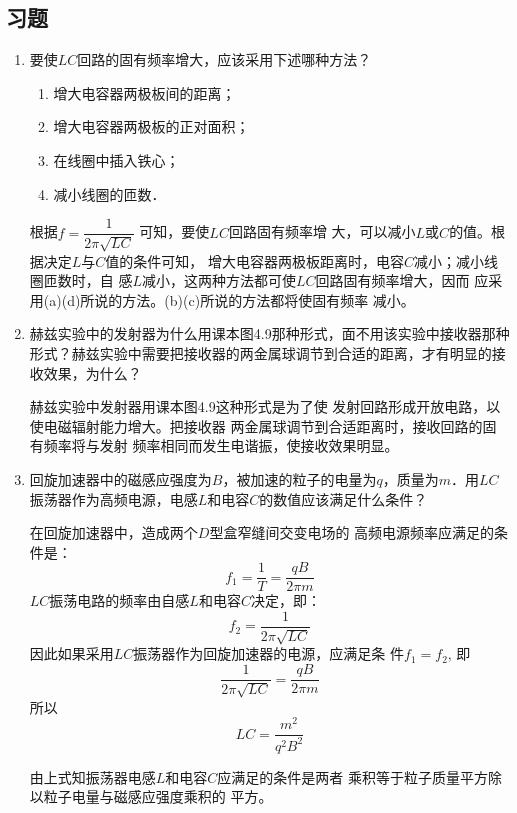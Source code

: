 \subsection{习题}
\begin{enumerate}
	\item 要使$LC$回路的固有频率增大，应该采用下述哪种方法？
	\begin{enumerate}
		\item 增大电容器两极板间的距离；
		\item 增大电容器两极板的正对面积；
		\item 在线圈中插入铁心；
		\item 减小线圈的匝数．
	\end{enumerate}

    \begin{solution}
根据$f=\dfrac{1}{2\pi\sqrt{LC}}$
可知，要使$LC$回路固有频率增
大，可以减小$L$或$C$的值。根据决定$L$与$C$值的条件可知，
增大电容器两极板距离时，电容$C$减小；减小线圈匝数时，自
感$L$减小，这两种方法都可使$LC$回路固有频率增大，因而
应采用(a)(d)所说的方法。(b)(c)所说的方法都将使固有频率
减小。
    \end{solution}
    
	\item 赫兹实验中的发射器为什么用课本图4.9那种形式，面不用该实验中接收器那种形式？赫兹实验中需要把接收器的两金属球调节到合适的距离，才有明显的接收效果，为什么？

    \begin{solution}
        赫兹实验中发射器用课本图4.9这种形式是为了使
        发射回路形成开放电路，以使电磁辐射能力增大。把接收器
        两金属球调节到合适距离时，接收回路的固有频率将与发射
        频率相同而发生电谐振，使接收效果明显。
    \end{solution}
    
	\item 回旋加速器中的磁感应强度为$B$，被加速的粒子的电量为$q$，质量为$m$．用$LC$振荡器作为高频电源，电感$L$和电容$C$的数值应该满足什么条件？

    \begin{solution}
在回旋加速器中，造成两个$D$型盒窄缝间交变电场的
高频电源频率应满足的条件是：
\[f_1=\frac{1}{T}=\frac{qB}{2\pi m}\]
$LC$振荡电路的频率由自感$L$和电容$C$决定，即：
\[f_2=\frac{1}{2\pi\sqrt{LC}}\]
因此如果采用$LC$振荡器作为回旋加速器的电源，应满足条
件$f_1=f_2$, 即
\[\frac{1}{2\pi\sqrt{LC}}=\frac{qB}{2\pi m}\]
所以
\[LC=\frac{m^2}{q^2B^2}\]

由上式知振荡器电感$L$和电容$C$应满足的条件是两者
乘积等于粒子质量平方除以粒子电量与磁感应强度乘积的
平方。
    \end{solution}
    

\end{enumerate}
